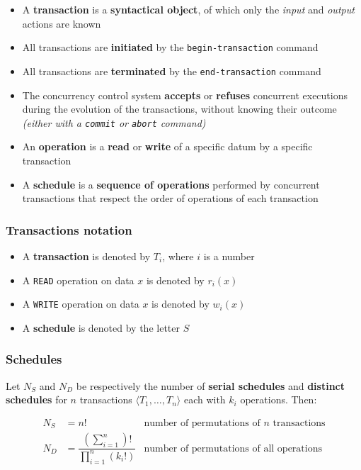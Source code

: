 \documentclass[english]{article}
\begin{document}
\begin{itemize}
  \item A \textbf{transaction} is a \textbf{syntactical object}, of which only the \textit{input} and \textit{output} actions are known
  \item All transactions are \textbf{initiated} by the \texttt{begin-transaction} command
  \item All transactions are \textbf{terminated} by the \texttt{end-transaction} command
  \item The concurrency control system \textbf{accepts} or \textbf{refuses} concurrent executions during the evolution of the transactions, without knowing their outcome \textit{(either with a \texttt{commit} or \texttt{abort} command)}
  \item An \textbf{operation} is a \textbf{read} or \textbf{write} of a specific datum by a specific transaction
  \item A \textbf{schedule} is a \textbf{sequence of operations} performed by concurrent transactions that respect the order of operations of each transaction
\end{itemize}

\subsubsection{Transactions notation}

\begin{itemize}
  \item A \textbf{transaction} is denoted by \(T_i\), where \(i\) is a number
  \item A \texttt{READ} operation on data \(x\) is denoted by \(r_i(x)\)
  \item A \texttt{WRITE} operation on data \(x\) is denoted by \(w_i(x)\)
  \item A \textbf{schedule} is denoted by the letter \(S\)
\end{itemize}

\subsubsection{Schedules}

Let \(N_S\) and \(N_D\) be respectively the number of \textbf{serial schedules} and \textbf{distinct schedules} for \(n\) transactions \(\langle T_1, \dots, T_n \rangle\) each with \(k_i\) operations.
Then:

\begin{align*}
  N_S & = n!                                                                                        \quad & \text{number of permutations of } n \text{ transactions} \\
  N_D & = \dfrac{\displaystyle \left(\sum_{i=1}^{n}\right)!}{\displaystyle \prod_{i=1}^{n} (k_i!)}        & \text{number of permutations of all operations}
\end{align*}
\end{document}
